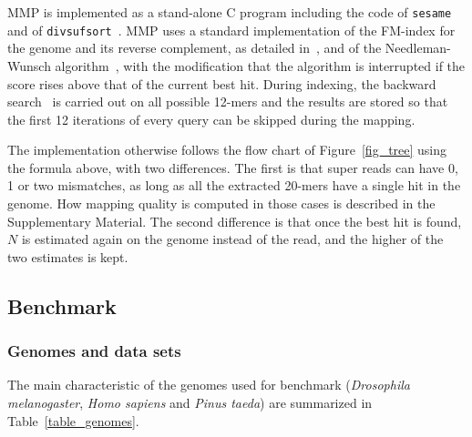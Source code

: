 \documentclass[a4,center,fleqn]{NAR}
\begin{document}
MMP is implemented as a stand-alone C program including the code of
\texttt{sesame}~\cite{Filion619155} and of
\texttt{divsufsort}~\cite{fischer2017dismantling}. MMP uses a standard
implementation of the FM-index for the genome and its reverse complement,
as detailed in~\cite{blog}, and of the Needleman-Wunsch
algorithm~\cite{pmid5420325}, with the modification that the algorithm is
interrupted if the score rises above that of the current best hit. During
indexing, the backward search~\cite{ferragina2000opportunistic} is carried
out on all possible 12-mers and the results are stored so that the first
12 iterations of every query can be skipped during the mapping.

The implementation otherwise follows the flow chart of
Figure~\ref{fig_tree} using the formula above, with two differences.
The first is that super reads can have 0, 1 or two mismatches, as long as
all the extracted 20-mers have a single hit in the genome. How mapping
quality is computed in those cases is described in the Supplementary
Material. The second difference is that once the best hit is found, $N$ is
estimated again on the genome instead of the read, and the higher of the
two estimates is kept.

\subsection{Benchmark}

\subsubsection{Genomes and data sets}

The main characteristic of the genomes used for benchmark
(\textit{Drosophila melanogaster}, \textit{Homo sapiens} and \textit{Pinus
taeda}) are summarized in Table~\ref{table_genomes}.

\begin{table}[b]
{}
\end{table}
\end{document}

